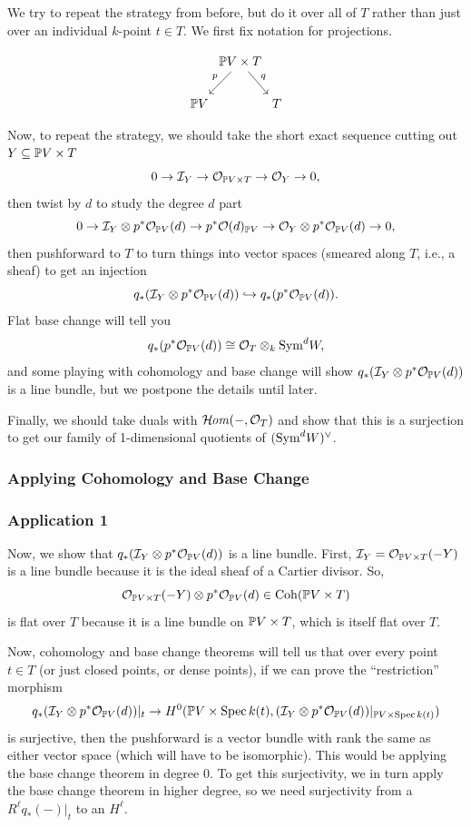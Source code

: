 \documentclass[12pt]{article}
\begin{document}
We try to repeat the strategy from before, but do it over all of $T$ rather than just over an individual $k$-point $t\in T$. We first fix notation for projections.

\[\begin{tikzcd}[column sep=0cm]
& \P V \times T \ar[dl,"p"'] \ar[dr, "q"] &\\
\P V & & T
\end{tikzcd}\]

Now, to repeat the strategy, we should take the short exact sequence cutting out $Y\subseteq \P V \times T$
\[0 \to \cI_Y \to \cO_{\P V \times T} \to \cO_Y \to 0,\]
then twist by $d$ to study the degree $d$ part
\[0 \to \cI_Y \otimes p^*\cO_{\P V}(d) \to p^*\cO(d)_{\P V} \to \cO_Y \otimes p^*\cO_{\P V}(d) \to 0,\]
then pushforward to $T$ to turn things into vector spaces (smeared along $T$, i.e., a sheaf) to get an injection
\[q_*(\cI_Y \otimes p^*\cO_{\P V}(d)) \hookrightarrow q_*(p^*\cO_{\P V}(d)).\]
Flat base change will tell you 
\[q_*(p^*\cO_{\P V}(d)) \cong \cO_T \otimes_k \Sym^d W,\]
and some playing with cohomology and base change will show $q_*(\cI_Y \otimes p^*\cO_{\P V}(d))$ is a line bundle, but we postpone the details until later.

Finally, we should take duals with $\cHom(-,\cO_T)$ and show that this is a surjection to get our family of 1-dimensional quotients of $(\Sym^d W)^\vee$.

\subsubsection{Applying Cohomology and Base Change}

\subsubsection*{Application 1}

Now, we show that $q_*(\cI_Y \otimes p^*\cO_{\P V}(d))$ is a line bundle. First, $\cI_Y = \cO_{\P V \times T}(-Y)$ is a line bundle because it is the ideal sheaf of a Cartier divisor. So,
\[\cO_{\P V \times T}(-Y) \otimes p^*\cO_{\P V}(d) \in \Coh(\P V \times T)\]
is flat over $T$ because it is a line bundle on $\P V \times T$, which is itself flat over $T$.

Now, cohomology and base change theorems \cite[Theorem 25.1.6]{vakil_rising_2025} will tell us that over every point $t\in T$ (or just closed points, or dense points), if we can prove the ``restriction'' morphism
\[q_*(\cI_Y \otimes p^*\cO_{\P V}(d))|_t \to H^0(\P V \times \Spec k(t), (\cI_Y \otimes p^*\cO_{\P V}(d))|_{\P V \times \Spec k(t)})\]
is surjective, then the pushforward is a vector bundle with rank the same as either vector space (which will have to be isomorphic). This would be applying the base change theorem in degree 0. To get this surjectivity, we in turn apply the base change theorem in higher degree, so we need surjectivity from a $R^\ell q_*(-)|_t$ to an $H^\ell$.
\end{document}
